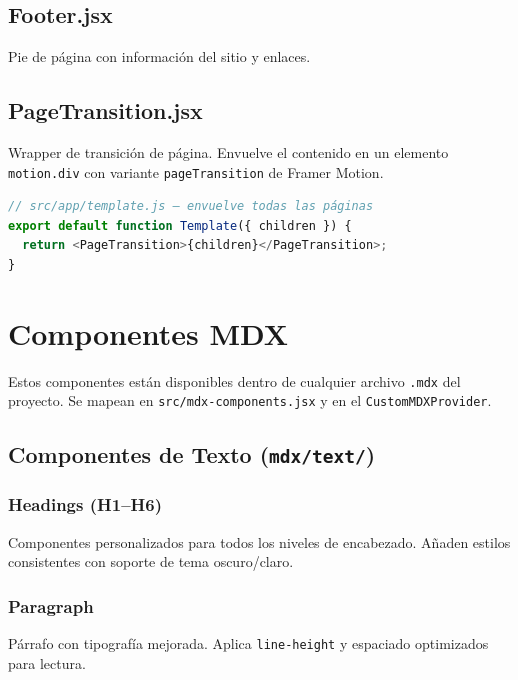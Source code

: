 \documentclass[12pt,a4paper]{article}
\begin{document}
\subsection{Footer.jsx}

Pie de página con información del sitio y enlaces.

\subsection{PageTransition.jsx}

Wrapper de transición de página. Envuelve el contenido en un elemento \texttt{motion.div} con variante \texttt{pageTransition} de Framer Motion.

\begin{lstlisting}[language=JavaScript]
// src/app/template.js — envuelve todas las páginas
export default function Template({ children }) {
  return <PageTransition>{children}</PageTransition>;
}
\end{lstlisting}

\section{Componentes MDX}

Estos componentes están disponibles dentro de cualquier archivo \texttt{.mdx} del proyecto. Se mapean en \texttt{src/mdx-components.jsx} y en el \texttt{CustomMDXProvider}.

\subsection{Componentes de Texto (\texttt{mdx/text/})}

\subsubsection{Headings (H1--H6)}

Componentes personalizados para todos los niveles de encabezado. Añaden estilos consistentes con soporte de tema oscuro/claro.

\subsubsection{Paragraph}

Párrafo con tipografía mejorada. Aplica \texttt{line-height} y espaciado optimizados para lectura.
\end{document}
